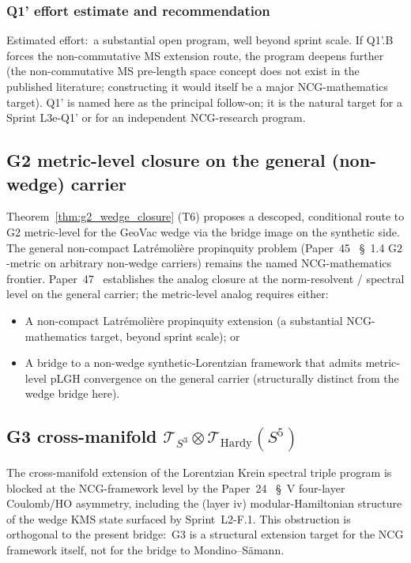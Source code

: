 \documentclass[11pt,a4paper]{article}
\theoremstyle{plain}
\theoremstyle{definition}
\newcommand{\sthree}{S^{3}}
\newcommand{\Tcal}{\mathcal{T}}
\begin{document}
\subsubsection*{Q1' effort estimate and recommendation}

Estimated effort:\ a substantial open program, well beyond sprint
scale. If Q1'.B forces the non-commutative MS extension route, the
program deepens further (the non-commutative MS pre-length space
concept does not exist in the published literature; constructing it
would itself be a major NCG-mathematics target). Q1' is named here as
the principal follow-on; it is the natural target for a Sprint
L3e-Q1' or for an independent NCG-research program.

\subsection{G2 metric-level closure on the general (non-wedge)
carrier}\label{sec:g2_general}

Theorem~\ref{thm:g2_wedge_closure} (T6) proposes a descoped, conditional
route to G2 metric-level for the GeoVac wedge via the bridge image on the synthetic side.
The general non-compact Latr\'emoli\`ere propinquity problem
(Paper~45~\cite{paper45} \S~1.4 $\mathrm{G2}$-metric on arbitrary
non-wedge carriers) remains the named NCG-mathematics frontier.
Paper~47~\cite{paper47} establishes the analog closure at the
norm-resolvent / spectral level on the general carrier; the
metric-level analog requires either:
\begin{itemize}
\item A non-compact Latr\'emoli\`ere propinquity extension (a
substantial NCG-mathematics target, beyond sprint scale); or
\item A bridge to a non-wedge synthetic-Lorentzian framework that
admits metric-level pLGH convergence on the general carrier
(structurally distinct from the wedge bridge here).
\end{itemize}

\subsection{G3 cross-manifold $\Tcal_{\sthree} \otimes
\Tcal_{\mathrm{Hardy}}(S^{5})$}\label{sec:g3}

The cross-manifold extension of the Lorentzian Krein spectral triple
program is blocked at the NCG-framework level by the
Paper~24~\cite{paper24} \S~V four-layer Coulomb/HO asymmetry,
including the (layer iv) modular-Hamiltonian structure of the wedge
KMS state surfaced by Sprint~L2-F.1. This obstruction is orthogonal
to the present bridge:\ G3 is a structural extension target for the
NCG framework itself, not for the bridge to Mondino--S\"amann.
\end{document}
